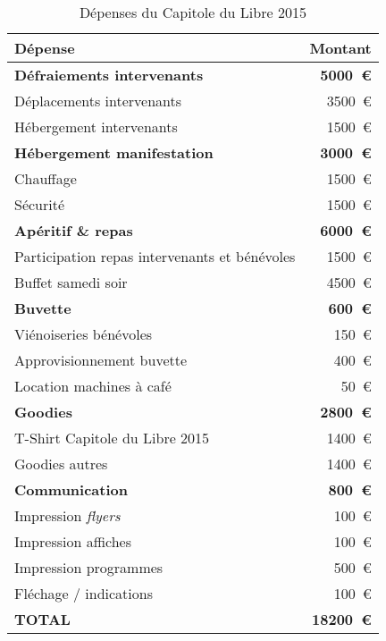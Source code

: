 \begin{table}
\begin{center}
	\caption{Dépenses du Capitole du Libre 2015}\label{tab_dépenses}
    \begin{tabular}{|l|r|}
        \hline \textbf{Dépense} & \textbf{Montant} \\
        \hline \textbf{Défraiements intervenants} & \textbf{\SI{5000}{€}} \\
        \hline Déplacements intervenants & \SI{3500}{€} \\
        \hline Hébergement intervenants & \SI{1500}{€} \\
        \hline \textbf{Hébergement manifestation} & \textbf{\SI{3000}{€}}\\
        \hline Chauffage & \SI{1500}{€} \\
        \hline Sécurité & \SI{1500}{€} \\
        \hline \textbf{Apéritif \& repas} & \textbf{\SI{6000}{€}}\\
        \hline Participation repas intervenants et bénévoles & \SI{1500}{€} \\
        \hline Buffet samedi soir & \SI{4500}{€} \\
        \hline \textbf{Buvette} & \textbf{\SI{600}{€}}\\
        \hline Viénoiseries bénévoles & \SI{150}{€} \\
        \hline Approvisionnement buvette & \SI{400}{€} \\
        \hline Location machines à café & \SI{50}{€} \\
        \hline \textbf{Goodies} & \textbf{\SI{2800}{€} }\\
        \hline T-Shirt Capitole du Libre 2015 & \SI{1400}{€} \\
        \hline Goodies autres & \SI{1400}{€} \\
        \hline \textbf{Communication} & \textbf{\SI{800}{€}} \\
        \hline Impression \textit{flyers} & \SI{100}{€} \\
        \hline Impression affiches & \SI{100}{€} \\
        \hline Impression programmes & \SI{500}{€} \\
        \hline Fléchage / indications & \SI{100}{€} \\
        \hline
        \hline \textbf{TOTAL} & \textbf{\SI{18200}{€}} \\
        \hline
    \end{tabular}
\end{center}
\end{table}

